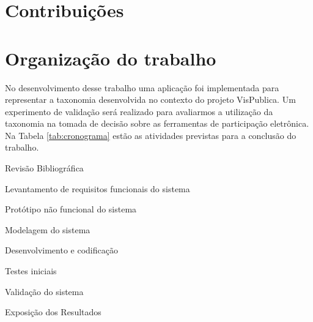 \section{Contribuições}
\label{sec:contribuicoes}

\section{Organização do trabalho}
\label{sec:organizacao}
No desenvolvimento desse trabalho uma aplicação foi implementada para representar a taxonomia desenvolvida no contexto do projeto VisPublica.
Um experimento de validação será realizado para avaliarmos a utilização da taxonomia na tomada de decisão sobre as ferramentas de participação eletrônica.
Na Tabela \ref{tab:cronograma} estão as atividades previstas para a conclusão do trabalho.
\begin{enumerate}
    \begin{singlespace}
    \fontsize{10}{12}\selectfont 
    \item\label{revisao}Revisão Bibliográfica
    \item\label{requisitos} Levantamento de requisitos funcionais do sistema
    \item\label{prototipo} Protótipo não funcional do sistema
    \item\label{modelagem} Modelagem do sistema
    \item\label{dev} Desenvolvimento e codificação
    \item\label{teste} Testes iniciais
    \item\label{validacao} Validação do sistema
    \item\label{expo} Exposição dos Resultados
    \end{singlespace}
\end{enumerate}

